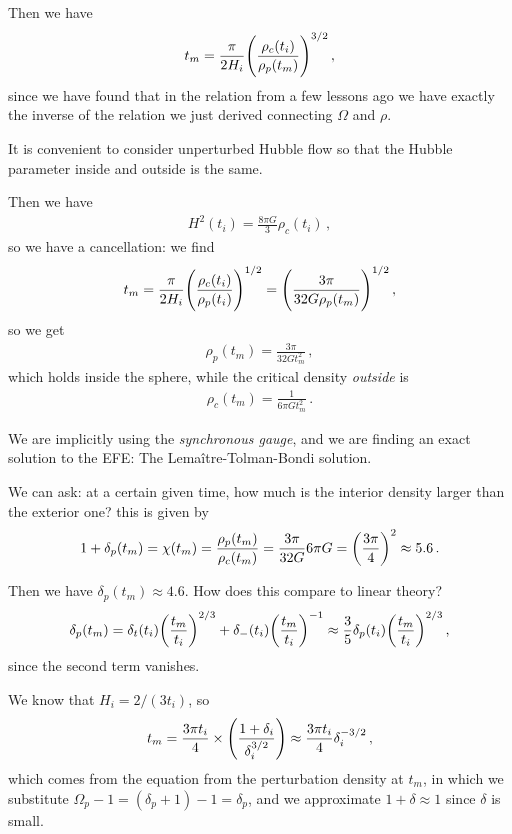 \documentclass[main.tex]{subfiles}
\begin{document}
Then we have 
%
\begin{align}
t_m = \frac{\pi }{2 H_i} \qty(\frac{\rho_{c}(t_i)}{\rho_{p}(t_m)})^{3/2}
\,,
\end{align}
%
since we have found that in the relation from a few lessons ago we have exactly the inverse of the relation we just derived connecting \(\Omega \) and \(\rho \). 

It is convenient to consider unperturbed Hubble flow so that the Hubble parameter inside and outside is the same. 

Then we have 
%
\begin{align}
H^2(t_i) = \frac{8 \pi G}{3} \rho_{c}(t_i)
\,,
\end{align}
%
so we have a cancellation: we find 
%
\begin{align}
t_m = \frac{\pi }{2 H_i} \qty(\frac{\rho_{c}(t_i)}{\rho_{p}(t_i)})^{1/2} = \qty(\frac{3 \pi }{32 G \rho_{p}(t_m)})^{1/2}
\,,
\end{align}
%
so we get 
%
\begin{align}
\rho_{p} (t_m) = \frac{3 \pi }{32 G t_m^2}
\,,
\end{align}
%
which holds inside the sphere, while the critical density \emph{outside} is 
%
\begin{align}
\rho_{c}(t_m) = \frac{1}{6 \pi G t_m^2}
\,.
\end{align}

We are implicitly using the \emph{synchronous gauge}, and we are finding an exact solution to the EFE: The Lemaître-Tolman-Bondi solution. 

We can ask: at a certain given time, how much is the interior density larger than the exterior one? this is given by 
%
\begin{align}
1 + \delta_{p}(t_m) = \chi (t_m) = \frac{\rho_{p}(t_m)}{\rho_{c}(t_m)} = \frac{3 \pi }{32 G } 6 \pi G = \qty(\frac{3 \pi }{4})^{2} \approx 5.6 
\,.
\end{align}

Then we have \(\delta_{p}(t_m) \approx 4.6\). 
How does this compare to linear theory? 
%
\begin{align}
\delta_p (t_m) = \delta_{t}(t_i) \qty(\frac{t_m }{t_i})^{2/3} + \delta_{-}(t_i) \qty(\frac{t_m}{t_i})^{-1}
\approx \frac{3}{5} \delta_{p}(t_i) \qty(\frac{t_m}{t_i})^{2/3} 
\,,
\end{align}
%
since the second term vanishes. 

We know that \(H_i = 2/ (3 t_i)\), so 
%
\begin{align}
t_m = \frac{3 \pi t_i}{4} \times \qty(\frac{1 + \delta_{i}}{ \delta_{i}^{3/2}}) \approx \frac{3 \pi t_i}{4} \delta_{i}^{-3/2}
\,,
\end{align}
%
which comes from the equation from the perturbation density at \(t_m\), in which we substitute \(\Omega_{p} - 1 = (\delta_{p} + 1)  - 1 = \delta_{p}\), and we approximate \(1 + \delta \approx 1\) since \(\delta \) is small. 
\end{document}
